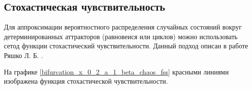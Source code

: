 \subsection{Стохастическая чувствительность}

    Для аппроксимации вероятностного распределения случайных состояний вокруг детерминированных аттракторов (равновеися или циклов) можно использовать сетод функции стохастический чувствительности. Данный подход описан в работе Ряшко Л. Б. \cite{Ryashko}.

    На графике \ref{bifurcation_x_0_2_a_1_beta_chaos_fss} красными линиями изображена функция стохастической чувствительности. 

    \begin{figure}
        \centering

            

\end{figure}
